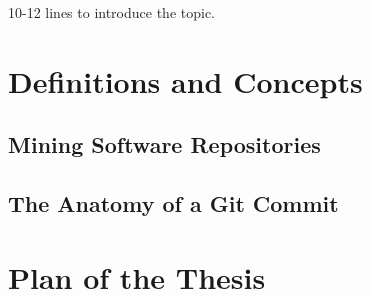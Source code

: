 \label{sec:Introduction}  

10-12 lines to introduce the topic.


\section{Definitions and Concepts}  %

\subsection{Mining Software Repositories}

\subsection{The Anatomy of a Git Commit}

\section{Plan of the Thesis}


